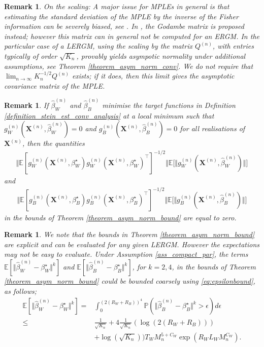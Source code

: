 \documentclass{article}
\newtheorem{Remark}[Theorem]{Remark}
\begin{document}
\begin{Remark}
    On the scaling: A major issue for MPLEs in general is that estimating   the standard deviation of the MPLE by the inverse of the Fisher information can be severely biased, see \cite{schmid2023computing}. In \cite{schmid2023computing}, the Godambe matrix is proposed instead; however this matrix can in general not be computed for an ERGM. In the particular case of a LERGM, using the scaling by the matrix $Q^{(n)}$, with entries typically of order $\sqrt{K_n}$, provably yields asympotic normality under additional assumptions, see Theorem \ref{theorem_asym_norm_conv}. We do not require that $\lim_{n\rightarrow \infty} K_n^{-1/2} Q^{(n)}$ exists; if it does, then this limit gives the asymptotic covariance matrix of the MPLE. 
\end{Remark}
\begin{Remark}
    If $\hat{\beta}_W^{(n)}$ and $\hat{\beta}_B^{(n)}$ minimise the target functions in Definition \ref{definition_stein_est_conv_analysis} at a local minimum such that $g_W^{(n)}(\mathbf{X}^{(n)},\hat{\beta}_W^{(n)})=0$ and $g_B^{(n)}(\mathbf{X}^{(n)},\hat{\beta}_B^{(n)})=0$ for all realisations of $\mathbf{X}^{(n)}$, then the  quantities 
    \begin{align*}
         \Vert \mathbb{E}[g_W^{(n)}(\mathbf{X}^{(n)},\beta_W^{\star})g_W^{(n)}(\mathbf{X}^{(n)},\beta_W^{\star})^{\top}]^{-1/2} \Vert \mathbb{E}\big[\Vert g_W^{(n)}(\mathbf{X}^{(n)},\hat{\beta}_W^{(n)}) \Vert \big]
    \end{align*}
    and
    \begin{align*}
         \Vert \mathbb{E}[g_B^{(n)}(\mathbf{X}^{(n)},\beta_B^{\star})g_B^{(n)}(\mathbf{X}^{(n)},\beta_B^{\star})^{\top}]^{-1/2} \Vert \mathbb{E}\big[\Vert g_B^{(n)}(\mathbf{X}^{(n)},\hat{\beta}_B^{(n)}) \Vert \big]
    \end{align*}
    in the bounds of Theorem \ref{theorem_asym_norm_bound} are equal to zero.
\end{Remark}
\begin{Remark} We note that the bounds in Theorem \ref{theorem_asym_norm_bound} are explicit and can be evaluated for any given LERGM. However the expectations may not be easy to evaluate. Under Assumption \ref{ass_compact_par}, the terms $\mathbb{E}[ \Vert \hat{\beta}_W^{(n)}-\beta_W^{\star}\Vert^k ]$  and  $\mathbb{E}[ \Vert \hat{\beta}_B^{(n)}-\beta_B^{\star}\Vert^k ]$, for $k=2,4$,  in the bounds of Theorem \ref{theorem_asym_norm_bound}  could be bounded coarsely using \eqref{eq:epsilonbound}, as follows; 
\begin{align*}
    \mathbb{E}[ \Vert \hat{\beta}_W^{(n)}-\beta_W^{\star}\Vert^k ]
    =&  \int_0^{(2 (R_W + R_B))^4} \mathbb{P}( \Vert \hat{\beta}_B^{(n)}-\beta_B^{\star} \Vert^k > \epsilon) d\epsilon \\
    \le&  \frac{1}{\sqrt{K_n}}
    + 4  \frac{1}{\sqrt{K_n}} ( \log (2 (R_W + R_B)) ) \\
    & + \log (\sqrt{K_n}) ) {T_W M_n^{5+C_W} \exp(R_W L_W M_n^{C_W} )}.    
\end{align*} 
\end{Remark}
\end{document}
